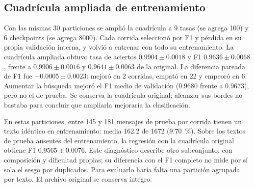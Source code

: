 \subsection{Cuadrícula ampliada de entrenamiento}
Con las mismas 30 particiones se amplió la cuadrícula a 9 tasas (se agrega
100) y 6 checkpoints (se agrega 8000). Cada corrida seleccionó por F1 y
pérdida en su propia validación interna, y volvió a entrenar con todo su
entrenamiento. La cuadrícula ampliada obtuvo tasa de aciertos
$0.9904\pm0.0018$ y F1 $0.9636\pm0.0068$, frente a
$0.9906\pm0.0016$ y $0.9641\pm0.0063$ de la original. La diferencia
pareada de F1 fue $-0.0005\pm0.0023$: mejoró en 2 corridas, empató en
22 y empeoró en 6. Aumentar la búsqueda mejoró el F1 medio de validación
(0.9680 frente a 0.9673), pero no el de prueba. Se conserva la cuadrícula
original; alcanzar sus bordes no bastaba para concluir que ampliarla mejoraría
la clasificación.

En estas particiones, entre 145 y 181 mensajes de prueba por corrida tienen
un texto idéntico en entrenamiento: media 162.2 de 1672 (9.70~\%). Sobre
los textos de prueba ausentes del entrenamiento, la regresión con la cuadrícula original obtiene
F1 $0.9565\pm0.0076$. Este diagnóstico describe otro subconjunto, con
composición y dificultad propias; su diferencia con el F1 completo no mide
por sí sola el sesgo por duplicados. Para evaluarlo haría falta una
partición agrupada por texto. El archivo original se conserva íntegro.
